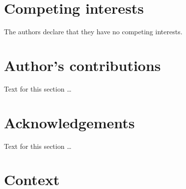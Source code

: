 \documentclass{bmcart}
\begin{document}
\begin{backmatter}

\section*{Competing interests}
  The authors declare that they have no competing interests.

\section*{Author's contributions}
    Text for this section \ldots

\section*{Acknowledgements}
  Text for this section \ldots




\section*{Context}


\end{backmatter}
\end{document}
